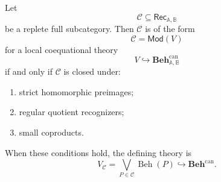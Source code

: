 \begin{theorem}
\label{thm:local-coequational-birkhoff}
    Let
    \[
        \mathcal C\subseteq\mathsf{Rec}_{\mathbb A,\mathbb B}
    \]
    be a replete full subcategory. Then \(\mathcal C\) is of the form
    \[
        \mathcal C=\mathsf{Mod}(V)
    \]
    for a local coequational theory
    \[
        V\hookrightarrow\mathbf{Beh}^{\mathrm{can}}_{\mathbb A,\mathbb B}
    \]
    if and only if \(\mathcal C\) is closed under:
    \begin{enumerate}
        \item strict homomorphic preimages;
        \item regular quotient recognizers;
        \item small coproducts.
    \end{enumerate}
    When these conditions hold, the defining theory is
    \[
        V_{\mathcal C}
        =
        \bigvee_{P\in\mathcal C}\operatorname{Beh}(P)
        \hookrightarrow\mathbf{Beh}^{\mathrm{can}}.
    \]
\end{theorem}

